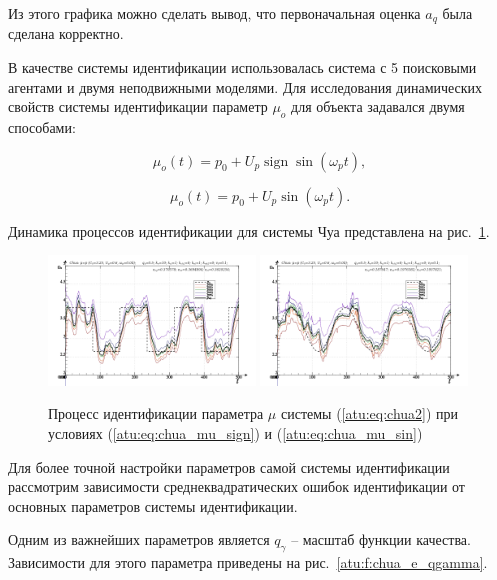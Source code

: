 \documentclass[a4paper,12pt]{article}
\DeclareMathOperator*{\sign}{sign}
\begin{document}
Из этого графика можно сделать вывод, что первоначальная оценка $a_q$
была сделана корректно.

В качестве системы идентификации использовалась система с 5 поисковыми агентами и
двумя неподвижными моделями. Для исследования динамических свойств системы идентификации
параметр $\mu_o$ для объекта задавался двумя способами:

\begin{equation}
 \mu_o(t) = p_0 + U_p \sign \sin( \omega_p t ),
  \label{atu:eq:chua_mu_sign}
\end{equation}

\begin{equation}
 \mu_o(t) = p_0 + U_p \sin( \omega_p t ).
  \label{atu:eq:chua_mu_sin}
\end{equation}

Динамика процессов идентификации для системы Чуа представлена на рис.~\ref{atu:f:chua_id}.


\begin{figure}[htb!]
\centerline{
  \includegraphics[width=0.49\textwidth]{p/cha/chua/chua_m5p-pl_n_sign.png}
  \includegraphics[width=0.49\textwidth]{p/cha/chua/chua_m5p-pl_n_sin.png}
}
\caption{Процесс идентификации параметра $\mu$ системы (\ref{atu:eq:chua2})
  при условиях (\ref{atu:eq:chua_mu_sign}) и (\ref{atu:eq:chua_mu_sin})
}
\label{atu:f:chua_id}
\end{figure}

Для более точной настройки параметров самой системы идентификации
рассмотрим зависимости среднеквадратических ошибок идентификации
от основных параметров системы идентификации.

Одним из важнейших параметров является $q_\gamma$ -- масштаб функции качества.
Зависимости для этого параметра приведены на рис.~\ref{atu:f:chua_e_qgamma}.
\end{document}
